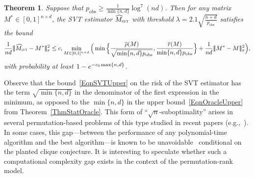 \documentclass[11pt, hidelinks]{article} %
\newtheorem{theorem}{Theorem}
\newcommand{\matsnorm}[2]{|\!|\!| #1 | \! | \!|_{{#2}}}
\newcommand{\frobnorm}[1]{\ensuremath{\matsnorm{#1}{\mbox{\tiny{F}}}}}
\newcommand{\numrows}{n}
\newcommand{\numcols}{d}
\newcommand{\plaincon}{c}
\newcommand{\UUP}{\ensuremath{\plaincon_{\mbox{\scalebox{.5}{1}}}}}
\newcommand{\UHP}{\ensuremath{\plaincon_{\mbox{\scalebox{.5}{0}}}}}
\newcommand{\wtmatrix}{M}
\newcommand{\wt}{\wtmatrix}
\newcommand{\wtstar}{\wtmatrix^*}
\newcommand{\wthat}{\widehat{\wtmatrix}}
\newcommand{\pp}{\ensuremath{p_{\mathrm{obs}}}}
\newcommand{\nnrank}{r}
\newcommand{\permrank}{\rho}
\newcommand{\fnpermrank}[1]{\overline{\permrank}(#1)}
\newcommand{\fnnnrank}[1]{\overline{\nnrank}(#1)}
\newcommand{\regpar}{\ensuremath{\lambda}}
\newcommand{\wthatSVT}{\wthat_{\mbox{\scalebox{.5}{SVT}}}}
\begin{document}
\begin{theorem}
\label{ThmSVT}
Suppose that $\pp \geq  \frac{1}{\min\{\numrows,\numcols\}}\log^7(\numrows \numcols)$. Then for any  matrix
$\wtstar \in [0,1]^{\numrows \times \numcols}$, the SVT estimator $\wthatSVT$
with threshold $\regpar = 2.1 \sqrt{\frac{\numrows+\numcols}{\pp}}$
satisfies the bound
\begin{align}
  \label{EqnSVTUpper}
\frac{1}{\numrows \numcols} \frobnorm{\wthatSVT - \wtstar}^2 \leq \UUP \min_{\wt \in [0,1]^{\numrows \times \numcols} }  \Big(
\min\Big\{ \frac{ \fnpermrank{\wt} }{\sqrt{\min \{\numrows, \numcols \} \pp} } , \frac{\fnnnrank{\wt}  }{ \min \{\numrows, \numcols \} \pp }  \Big\} +  \frac{1}{\numrows \numcols} \frobnorm{\wtstar -\wt}^2 \Big), 
\end{align}
with probability at least $1 - e^{- \UHP  \max\{\numrows,\numcols\}}$.
\end{theorem}
%
Observe that the bound~\eqref{EqnSVTUpper} on the risk of the SVT
estimator has the term $\sqrt{\min\{\numrows,\numcols\}}$ in the
denominator of the first expression in the minimum, as opposed to the
$\min\{\numrows,\numcols\}$ in the upper bound~\eqref{EqnOracleUpper}
from Theorem~\ref{ThmStatOracle}.  This form of
``$\sqrt{n}$-suboptimality'' arises in several permutation-based
problems of this type studied in recent papers
(e.g.,~\cite{shah2015stochastically, shah2016feeling,
  chatterjee2016estimation, shah2016permutation,
  flammarion2016optimal, pananjady2016linear}).  In some cases, this
gap---between the performance of any polynomial-time algorithm and the
best algorithm---is known to be unavoidable~\cite{shah2016feeling}
conditional on the planted clique conjecture.  It is interesting to
speculate whether such a computational complexity gap exists in the
context of the permutation-rank model.
\end{document}
